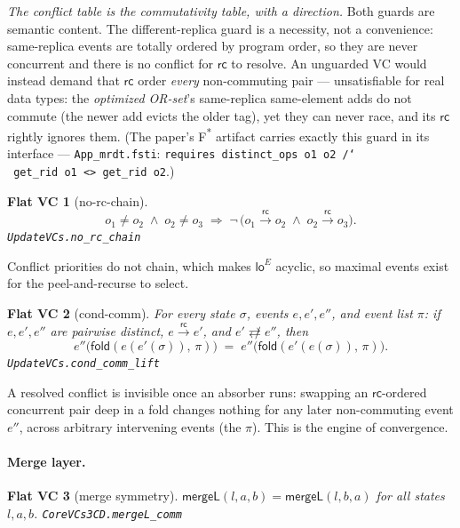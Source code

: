 \documentclass[11pt]{article}
\newtheorem{fvc}{Flat VC}
\newcommand{\rc}{\xrightarrow{\mathsf{rc}}}      %
\newcommand{\rcrel}{\mathsf{rc}}                 %
\newcommand{\ncomm}{\not\rightleftarrows}
\newcommand{\mergeL}{\mathsf{mergeL}}
\newcommand{\loE}[1]{\mathsf{lo}^{#1}}
\newcommand{\lean}[1]{\texttt{#1}}
\newcommand{\fold}{\mathsf{fold}}
\begin{document}
\emph{The conflict table is the commutativity table, with a direction.}
Both guards are semantic content. The different-replica guard is a
necessity, not a convenience: same-replica events are totally ordered
by program order, so they are never concurrent and there is no
conflict for $\rcrel$ to resolve. An unguarded VC would instead
demand that $\rcrel$ order \emph{every} non-commuting pair ---
unsatisfiable for real data types: the \emph{optimized OR-set}'s
same-replica same-element adds do not commute (the newer add evicts
the older tag), yet they can never race, and its $\rcrel$
rightly ignores them. (The paper's F\textsuperscript{*} artifact
carries exactly this guard in its interface ---
\lean{App\_mrdt.fsti}: \texttt{requires distinct\_ops o1 o2
/\char`\\\ get\_rid o1 <> get\_rid o2}.)

\begin{fvc}[no-rc-chain]
\label{fvc:chain}
\[
  o_1 \ne o_2 \;\wedge\; o_2 \ne o_3
  \;\Longrightarrow\;
  \neg\,\bigl(o_1 \rc o_2 \;\wedge\; o_2 \rc o_3\bigr).
\]
\hfill\lean{UpdateVCs.no\_rc\_chain}
\end{fvc}

Conflict priorities do not chain, which makes $\loE{E}$ acyclic, so
maximal events exist for the peel-and-recurse to select.

\begin{fvc}[cond-comm]
\label{fvc:condcomm}
For every state $\sigma$, events $e, e', e''$, and event list $\pi$:
if $e, e', e''$ are pairwise distinct, $e \rc e'$, and $e' \ncomm e''$,
then
\[
  e''\bigl(\fold(e(e'(\sigma)),\, \pi)\bigr)
  \;=\;
  e''\bigl(\fold(e'(e(\sigma)),\, \pi)\bigr).
\]
\hfill\lean{UpdateVCs.cond\_comm\_lift}
\end{fvc}

A resolved conflict is invisible once an absorber runs: swapping an
$\rcrel$-ordered concurrent pair deep in a fold changes nothing for any
later non-commuting event $e''$, across arbitrary intervening events
(the $\pi$). This is the engine of convergence.

\paragraph{Merge layer.}

\begin{fvc}[merge symmetry]
\label{fvc:sym}
$\mergeL(l, a, b) = \mergeL(l, b, a)$ for all states $l, a, b$.
\hfill\lean{CoreVCs3CD.mergeL\_comm}
\end{fvc}
\end{document}
